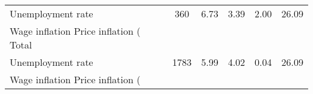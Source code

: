 \begin{table}[htbp]
\begin{tabular}{l*{1}{ccccc}}
Unemployment rate   &         360&        6.73&        3.39&        2.00&       26.09\\
Wage inflation %
Price inflation (%
\hline
Total               &            &            &            &            &            \\
Unemployment rate   &        1783&        5.99&        4.02&        0.04&       26.09\\
Wage inflation %
Price inflation (%
\hline\hline
\end{tabular}
\end{table}
